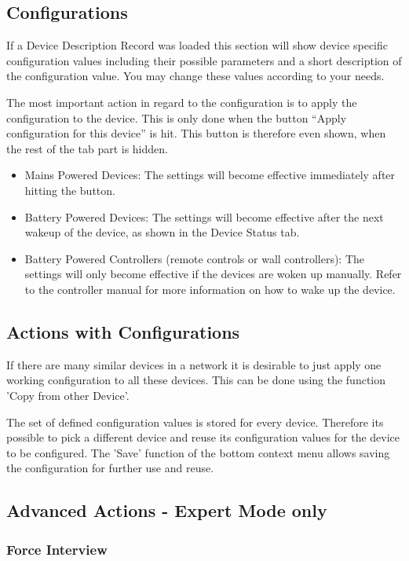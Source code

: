 \subsection{Configurations}

If a Device Description Record was loaded this section will show device specific configuration values 
including their possible parameters and a short description of the configuration value. You may change 
these values according to your needs.

The most important action in regard to the configuration is to apply the configuration to the device. 
This is only done when the button “Apply configuration for this device” is hit. This button is 
therefore even shown, when the rest of the tab part is hidden.
\begin{itemize}
\item  Mains Powered Devices: The settings will become effective immediately after hitting the button.
\item  Battery Powered Devices: The settings will become effective after the next wakeup of the device, 
as shown in the Device Status tab.
\item  Battery Powered Controllers (remote controls or wall controllers): The settings will only become 
effective if the devices are woken up manually. Refer to the controller manual for more information 
on how to wake up the device. 
\end{itemize}

\subsection{Actions with Configurations}

If there are many similar devices in a network it is desirable to just apply one working configuration 
to all these devices. This can be done using the function 'Copy from other Device'.

The set of defined configuration values is stored for every device. Therefore its possible to pick a 
different device and reuse its configuration values for the device to be configured.  The 'Save' 
function of the bottom context menu allows saving the configuration for further use and reuse.

\subsection{Advanced Actions - Expert Mode only}

\subsubsection{Force Interview}  


